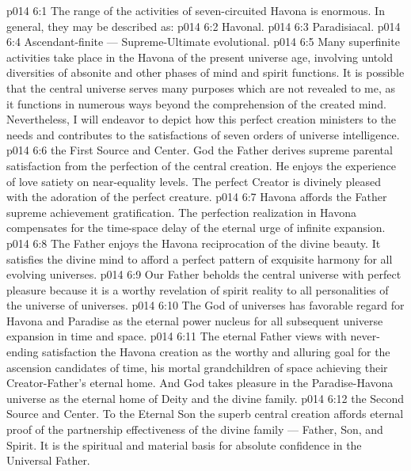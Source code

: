 \vs p014 6:1 The range of the activities of seven\hyp{}circuited Havona is enormous. In general, they may be described as:
\vs p014 6:2 \bibnobreakspace Havonal.
\vs p014 6:3 \bibnobreakspace Paradisiacal.
\vs p014 6:4 \bibnobreakspace Ascendant\hyp{}finite --- Supreme\hyp{}Ultimate evolutional.
\vs p014 6:5 \pc Many superfinite activities take place in the Havona of the present universe age, involving untold diversities of absonite and other phases of mind and spirit functions. It is possible that the central universe serves many purposes which are not revealed to me, as it functions in numerous ways beyond the comprehension of the created mind. Nevertheless, I will endeavor to depict how this perfect creation ministers to the needs and contributes to the satisfactions of seven orders of universe intelligence.
\vs p014 6:6 \pc {}\bibnobreakspace {} the First Source and Center. God the Father derives supreme parental satisfaction from the perfection of the central creation. He enjoys the experience of love satiety on near\hyp{}equality levels. The perfect Creator is divinely pleased with the adoration of the perfect creature.
\vs p014 6:7 Havona affords the Father supreme achievement gratification. The perfection realization in Havona compensates for the time\hyp{}space delay of the eternal urge of infinite expansion.
\vs p014 6:8 The Father enjoys the Havona reciprocation of the divine beauty. It satisfies the divine mind to afford a perfect pattern of exquisite harmony for all evolving universes.
\vs p014 6:9 Our Father beholds the central universe with perfect pleasure because it is a worthy revelation of spirit reality to all personalities of the universe of universes.
\vs p014 6:10 The God of universes has favorable regard for Havona and Paradise as the eternal power nucleus for all subsequent universe expansion in time and space.
\vs p014 6:11 The eternal Father views with never\hyp{}ending satisfaction the Havona creation as the worthy and alluring goal for the ascension candidates of time, his mortal grandchildren of space achieving their Creator\hyp{}Father’s eternal home. And God takes pleasure in the Paradise\hyp{}Havona universe as the eternal home of Deity and the divine family.
\vs p014 6:12 \pc {}\bibnobreakspace {} the Second Source and Center. To the Eternal Son the superb central creation affords eternal proof of the partnership effectiveness of the divine family --- Father, Son, and Spirit. It is the spiritual and material basis for absolute confidence in the Universal Father.
